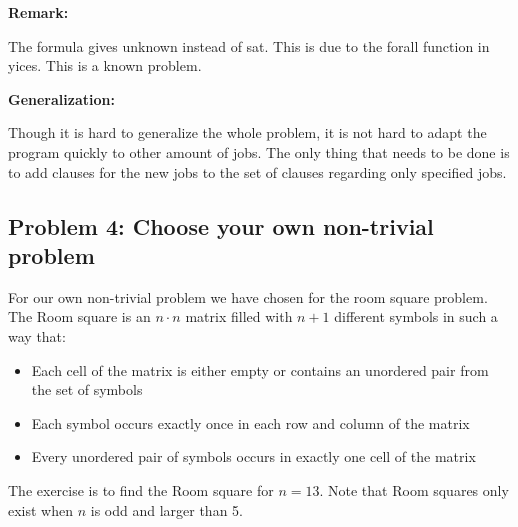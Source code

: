 \documentclass[12pt]{article}
\begin{document}
{{\bf Remark:}

The formula gives unknown instead of sat. This is due to the forall function in yices. This is a known problem.\\

\vspace{3mm}

{\bf Generalization:}

Though it is hard to generalize the whole problem, it is not hard to adapt the program quickly to other amount of jobs. The only thing that needs to be done is to add clauses for the new jobs to the set of clauses regarding only specified jobs.\\

\vspace{3mm}

\subsection*{Problem 4: Choose your own non-trivial problem}

For our own non-trivial problem we have chosen for the room square problem. The Room square is an $n \cdot n$ matrix filled with $n+1$ different symbols in such a way that:\\
\begin{itemize}
\item Each cell of the matrix is either empty or contains an unordered pair from the set of symbols
\item Each symbol occurs exactly once in each row and column of the matrix
\item Every unordered pair of symbols occurs in exactly one cell of the matrix
\end{itemize}
The exercise is to find the Room square for $n = 13$. Note that Room squares only exist when $n$ is odd and larger than 5.
\vspace{8mm}

}
\end{document}
